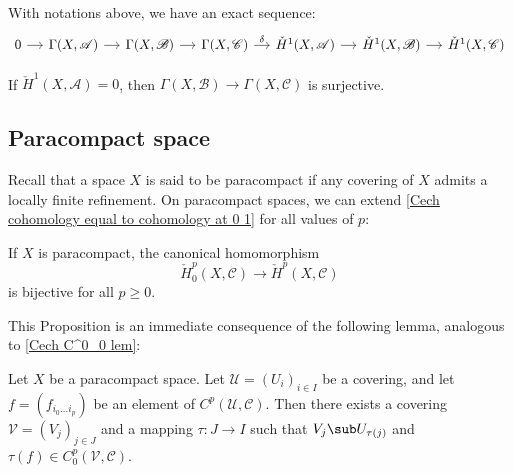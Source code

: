 \begin{corollary}\label{Cech long exact seq general}
With notations above, we have an exact sequence:
\[\begin{tikzcd}[column sep=small]
0\ar[r]&\Gamma(X,\mathscr{A})\ar[r]&\Gamma(X,\mathscr{B})\ar[r]&\Gamma(X,\mathscr{C})\ar[r,"\delta"]&\check{H}^1(X,\mathscr{A})\ar[r]&\check{H}^1(X,\mathscr{B})\ar[r]&\check{H}^1(X,\mathscr{C})
\end{tikzcd}\]
\end{corollary}
\begin{corollary}\label{Cech global section exact}
If $\check{H}^1(X,\mathscr{A})=0$, then $\Gamma(X,\mathscr{B})\to\Gamma(X,\mathscr{C})$ is surjective.
\end{corollary}
\subsection{Paracompact space}
Recall that a space $X$ is said to be paracompact if any covering of $X$ admits a locally finite refinement. On paracompact spaces, we can extend \cref{Cech cohomology equal to cohomology at 0 1}  for all values of $p$:
\begin{theorem}\label{Cech paracompact thm}
If $X$ is paracompact, the canonical homomorphism
\[\check{H}^p_0(X,\mathscr{C})\to\check{H}^p(X,\mathscr{C})\]
is bijective for all $p\geq0$.
\end{theorem}
This Proposition is an immediate consequence of the following lemma, analogous to \cref{Cech C^0_0 lem}:
\begin{lemma}
Let $X$ be a paracompact space. Let $\mathcal{U}=(U_i)_{i\in I}$ be a covering, and let $f=(f_{i_0\dots i_p})$ be an element of $C^p(\mathcal{U},\mathscr{C})$. Then there exists a covering $\mathcal{V}=(V_j)_{j\in J}$ and a mapping $\tau:J\to I$ such that $V_j\sub U_{\tau(j)}$ and $\tau(f)\in C_0^p(\mathcal{V},\mathscr{C})$.
\end{lemma}
